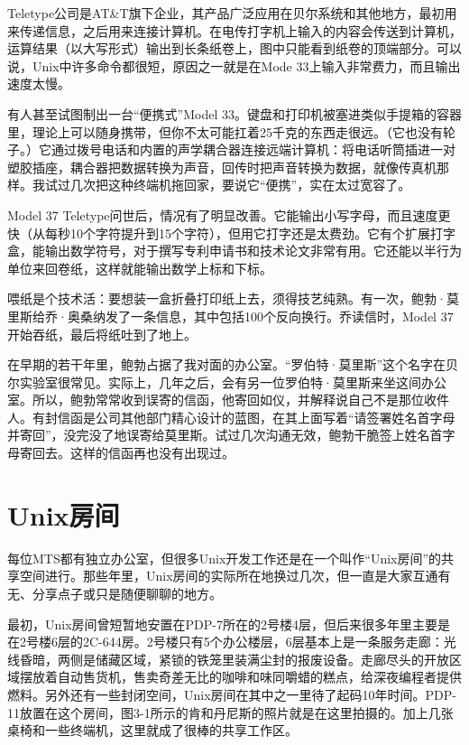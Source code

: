\documentclass[a4paper,12pt,UTF8,twoside]{ctexbook}
\begin{document}
Teletype公司是AT\&T旗下企业，其产品广泛应用在贝尔系统和其他地方，最初用来传递信息，之后用来连接计算机。在电传打字机上输入的内容会传送到计算机，运算结果（以大写形式）输出到长条纸卷上，图中只能看到纸卷的顶端部分。可以说，Unix中许多命令都很短，原因之一就是在Mode 33上输入非常费力，而且输出速度太慢。

有人甚至试图制出一台“便携式”Model 33。键盘和打印机被塞进类似手提箱的容器里，理论上可以随身携带，但你不太可能扛着25千克的东西走很远。（它也没有轮子。）它通过拨号电话和内置的声学耦合器连接远端计算机：将电话听筒插进一对塑胶插座，耦合器把数据转换为声音，回传时把声音转换为数据，就像传真机那样。我试过几次把这种终端机拖回家，要说它“便携”，实在太过宽容了。

Model 37 Teletype问世后，情况有了明显改善。它能输出小写字母，而且速度更快（从每秒10个字符提升到15个字符），但用它打字还是太费劲。它有个扩展打字盒，能输出数学符号，对于撰写专利申请书和技术论文非常有用。它还能以半行为单位来回卷纸，这样就能输出数学上标和下标。

喂纸是个技术活：要想装一盒折叠打印纸上去，须得技艺纯熟。有一次，鲍勃·莫里斯给乔·奥桑纳发了一条信息，其中包括100个反向换行。乔读信时，Model 37开始吞纸，最后将纸吐到了地上。

在早期的若干年里，鲍勃占据了我对面的办公室。“罗伯特·莫里斯”这个名字在贝尔实验室很常见。实际上，几年之后，会有另一位罗伯特·莫里斯来坐这间办公室。所以，鲍勃常常收到误寄的信函，他寄回如仪，并解释说自己不是那位收件人。有封信函是公司其他部门精心设计的蓝图，在其上面写着“请签署姓名首字母并寄回”，没完没了地误寄给莫里斯。试过几次沟通无效，鲍勃干脆签上姓名首字母寄回去。这样的信函再也没有出现过。

\section{Unix房间}

每位MTS都有独立办公室，但很多Unix开发工作还是在一个叫作“Unix房间”的共享空间进行。那些年里，Unix房间的实际所在地换过几次，但一直是大家互通有无、分享点子或只是随便聊聊的地方。

最初，Unix房间曾短暂地安置在PDP-7所在的2号楼4层，但后来很多年里主要是在2号楼6层的2C-644房。2号楼只有5个办公楼层，6层基本上是一条服务走廊：光线昏暗，两侧是储藏区域，紧锁的铁笼里装满尘封的报废设备。走廊尽头的开放区域摆放着自动售货机，售卖奇差无比的咖啡和味同嚼蜡的糕点，给深夜编程者提供燃料。另外还有一些封闭空间，Unix房间在其中之一里待了起码10年时间。PDP-11放置在这个房间，图3-1所示的肯和丹尼斯的照片就是在这里拍摄的。加上几张桌椅和一些终端机，这里就成了很棒的共享工作区。
\end{document}
